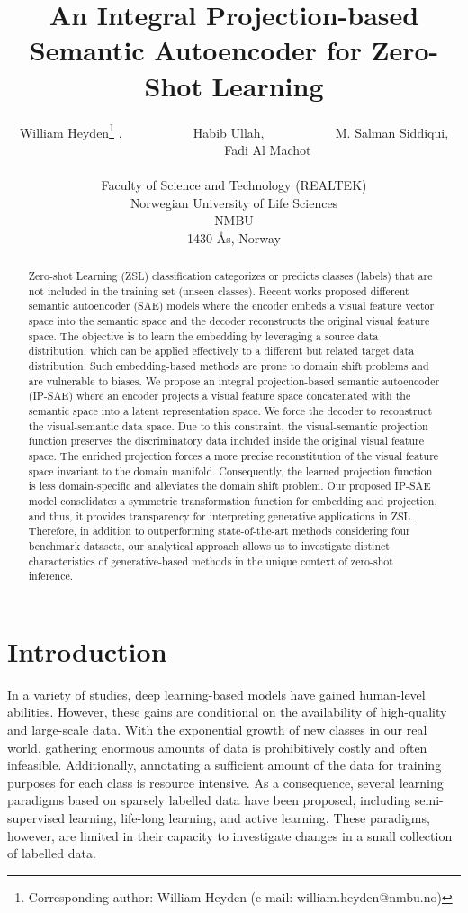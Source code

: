\documentclass{article}
\title{An Integral Projection-based Semantic Autoencoder for Zero-Shot Learning
}
\author{
  William Heyden\thanks{Corresponding author: William Heyden (e-mail: william.heyden@nmbu.no)} ,
  {~~~~~~~~~~} Habib Ullah, 
  {~~~~~~~~~~} M. Salman Siddiqui, 
  {~~~~~~~~~~} Fadi Al Machot\\
  \\
  Faculty of Science and Technology (REALTEK) \\
  Norwegian University of Life Sciences \\ NMBU \\
  1430 Ås, Norway\\
}
\begin{document}
\maketitle


\begin{abstract}
Zero-shot Learning (ZSL) classification categorizes or predicts classes (labels) that are not included in the training set (unseen classes). Recent works proposed different semantic autoencoder (SAE) models where the encoder embeds a visual feature vector space into the semantic space and the decoder reconstructs the original visual feature space. The objective is to learn the embedding by leveraging a source data distribution, which can be applied effectively to a different but related target data distribution. Such embedding-based methods are prone to domain shift problems and are vulnerable to biases. We propose an integral projection-based semantic autoencoder (IP-SAE) where an encoder projects a visual feature space concatenated with the semantic space into a latent representation space. We force the decoder to reconstruct the visual-semantic data space. Due to this constraint, the visual-semantic projection function preserves the discriminatory data included inside the original visual feature space. The enriched projection forces a more precise reconstitution of the visual feature space invariant to the domain manifold. Consequently, the learned projection function is less domain-specific and alleviates the domain shift problem. Our proposed IP-SAE model consolidates a symmetric transformation function for embedding and projection, and thus, it provides transparency for interpreting generative applications in ZSL. Therefore, in addition to outperforming state-of-the-art methods considering four benchmark datasets, our analytical approach allows us to investigate distinct characteristics of generative-based methods in the unique context of zero-shot inference.
\end{abstract}

\maketitle

\section{Introduction}
\label{sec:introduction}
In a variety of studies, deep learning-based models have gained human-level abilities. However, these gains are conditional on the availability of high-quality and large-scale data. With the exponential growth of new classes in our real world, gathering enormous amounts of data is prohibitively costly and often infeasible. Additionally, annotating a sufficient amount of the data for training purposes for each class is resource intensive. As a consequence, several learning paradigms based on sparsely labelled data have been proposed, including semi-supervised learning, life-long learning, and active learning. These paradigms, however, are limited in their capacity to investigate changes in a small collection of labelled data. 
\end{document}
